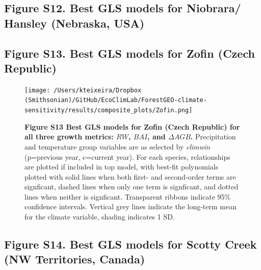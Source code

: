 \documentclass[
]{article}
\begin{document}
\newpage

\hypertarget{figure-s12.-best-gls-models-for-niobrara-hansley-nebraska-usa}{%
\subsection{Figure S12. Best GLS models for Niobrara/ Hansley (Nebraska,
USA)}\label{figure-s12.-best-gls-models-for-niobrara-hansley-nebraska-usa}}

\newpage

\hypertarget{figure-s13.-best-gls-models-for-zofin-czech-republic}{%
\subsection{Figure S13. Best GLS models for Zofin (Czech
Republic)}\label{figure-s13.-best-gls-models-for-zofin-czech-republic}}

\begin{figure}
\centering
\texttt{[image: /Users/kteixeira/Dropbox (Smithsonian)/GitHub/EcoClimLab/ForestGEO-climate-sensitivity/results/composite\_plots/Zofin.png]}
\caption{\textbf{Figure S13 \textbar{} Best GLS models for Zofin (Czech
Republic) for all three growth metrics: \(RW\), \(BAI\), and
\(\Delta AGB\).} Precipitation and temperature group variables are as
selected by \emph{climwin} (p=previous year, c=current year). For each
species, relationships are plotted if included in top model, with
best-fit polynomials plotted with solid lines when both first- and
second-order terms are signficant, dashed lines when only one term is
signficant, and dotted lines when neither is signficant. Transparent
ribbons indicate 95\% confidence intervals. Vertical grey lines indicate
the long-term mean for the climate variable, shading indicates 1 SD.}
\end{figure}

\newpage

\hypertarget{figure-s14.-best-gls-models-for-scotty-creek-nw-territories-canada}{%
\subsection{Figure S14. Best GLS models for Scotty Creek (NW
Territories,
Canada)}\label{figure-s14.-best-gls-models-for-scotty-creek-nw-territories-canada}}
\end{document}

